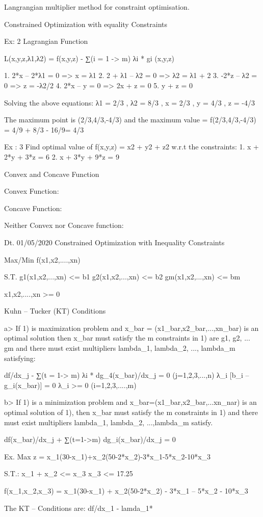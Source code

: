 Langrangian multiplier method for constraint optimisation.


Constrained Optimization with equality Constraints

Ex: 2
Lagrangian Function

L(x,y,z,λ1,λ2) = f(x,y,z) - ∑(i = 1 -> m) λi * gi (x,y,z)


1. 2*x – 2*λ1 = 0 		=> x = λ1
2. 2 + λ1 – λ2  = 0		=> λ2 = λ1 + 2
3. -2*z – λ2 = 0		=> z = -λ2/2
4. 2*x – y = 0			=> 2x + z = 0
5. y + z = 0

Solving the above equations:
λ1 = 2/3 , λ2 = 8/3 , x = 2/3 , y = 4/3 , z = -4/3

The maximum point is (2/3,4/3,-4/3)
and the maximum value = f(2/3,4/3,-4/3) = 4/9 + 8/3 - 16/9= 4/3

Ex : 3 Find optimal value of f(x,y,z) = x2 + y2 + z2 
		w.r.t the constraints:
1. x + 2*y + 3*z = 6
2. x + 3*y + 9*z = 9



					Convex and Concave Function

Convex Function:

Concave Function:


Neither Convex nor Concave function:







Dt. 01/05/2020
Constrained Optimization with Inequality Constraints

Max/Min f(x1,x2,....,xn)

S.T.
g1(x1,x2,...,xn) <= b1
g2(x1,x2,...,xn) <= b2
gm(x1,x2,...,xn) <= bm

x1,x2,....,xn >= 0

Kuhn – Tucker (KT) Conditions

a> If  1) is maximization problem and x_bar = (x1_bar,x2_bar,...,xn_bar) is an optimal solution then x_bar must satisfy the m constraints in 1) are g1, g2, ... gm and there must exist multipliers lambda_1, lambda_2, ..., lambda_m satisfying:

df/dx_j - ∑(t = 1-> m) λi * dg_4(x_bar)/dx_j = 0 (j=1,2,3,...,n)
λ_i [b_i – g_i(x_bar)] = 0
λ_i >= 0 (i=1,2,3,....,m)

b> If 1) is a minimization problem and x_bar=(x1_bar,x2_bar,...xn_nar) is an optimal solution of 1), then x_bar must satisfy the m constraints in 1)  and there must exist multipliers lambda_1, lambda_2, ...,lambda_m satisfy.

df(x_bar)/dx_j + ∑(t=1->m) dg_i(x_bar)/dx_j = 0


Ex. Max z = x_1(30-x_1)+x_2(50-2*x_2)-3*x_1-5*x_2-10*x_3

S.T.:
	x_1 + x_2 <= x_3
	x_3 <= 17.25

f(x_1,x_2,x_3) = x_1(30-x_1) + x_2(50-2*x_2) - 3*x_1 – 5*x_2 - 10*x_3


The KT – Conditions are:
df/dx_1 - lamda_1*




 
